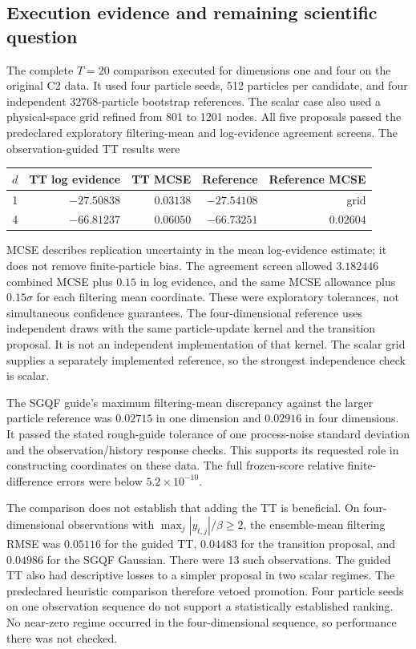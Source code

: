 \documentclass[11pt]{article}
\begin{document}
\subsection{Execution evidence and remaining scientific question}
\label{sec:exec-results}
The complete $T=20$ comparison executed for dimensions one and four on the
original C2 data. It used four particle seeds, 512 particles per candidate,
and four independent 32768-particle bootstrap references. The scalar case
also used a physical-space grid refined from 801 to 1201 nodes. All five
proposals passed the predeclared exploratory filtering-mean and log-evidence
agreement screens. The observation-guided TT results were
\begin{center}
\begin{tabular}{rrrrr}
\hline
$d$ & TT log evidence & TT MCSE & Reference & Reference MCSE\\
\hline
1 & $-27.50838$ & $0.03138$ & $-27.54108$ & grid\\
4 & $-66.81237$ & $0.06050$ & $-66.73251$ & $0.02604$\\
\hline
\end{tabular}
\end{center}
MCSE describes replication uncertainty in the mean log-evidence estimate;
it does not remove finite-particle bias. The agreement screen allowed
$3.182446$ combined MCSE plus $0.15$ in log evidence, and the same MCSE
allowance plus $0.15\sigma$ for each filtering mean coordinate. These were
exploratory tolerances, not simultaneous confidence guarantees.
The four-dimensional reference uses independent draws with the same
particle-update kernel and the transition proposal. It is not an independent
implementation of that kernel. The scalar grid supplies a separately
implemented reference, so the strongest independence check is scalar.

The SGQF guide's maximum filtering-mean discrepancy against the larger
particle reference was $0.02715$ in one dimension and $0.02916$ in four
dimensions. It passed the stated rough-guide tolerance of one process-noise
standard deviation and the observation/history response checks. This supports
its requested role in constructing coordinates on these data. The full
frozen-score relative finite-difference errors were below
$5.2\times10^{-10}$.

The comparison does not establish that adding the TT is beneficial. On
four-dimensional observations with
$\max_j|y_{t,j}|/\beta\geq2$, the ensemble-mean filtering RMSE was
$0.05116$ for the guided TT, $0.04483$ for the transition proposal, and
$0.04986$ for the SGQF Gaussian. There were 13 such observations. The guided
TT also had descriptive losses to a simpler proposal in two scalar regimes.
The predeclared heuristic comparison therefore vetoed promotion. Four
particle seeds on one observation sequence do not support a statistically
established ranking. No near-zero regime occurred in the four-dimensional
sequence, so performance there was not checked.
\end{document}

